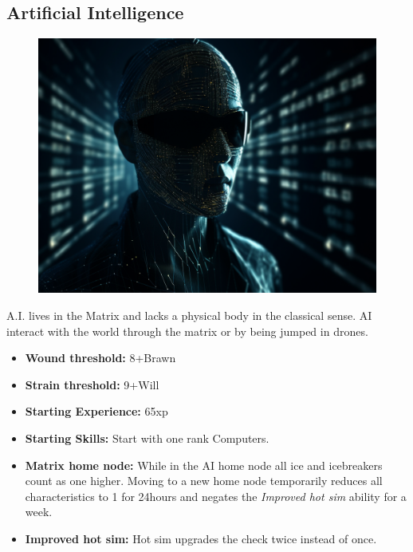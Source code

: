 \documentclass{book}
\begin{document}
\begin{multicols}{2}
	\subsection{Artificial Intelligence}
	\begin{figure}[H]
		\centering
		\includegraphics[width=0.7\linewidth]{images/ai}
		\caption[Artificial intelligence]{}
		\label{fig:ai}
	\end{figure}
	
	A.I. lives in the Matrix and lacks a physical body in the classical sense. AI interact with the world through the matrix or by being jumped in drones.
	
	\begin{itemize}
		\item \textbf{Wound threshold:} 8+Brawn
		\item \textbf{Strain threshold:} 9+Will
		\item \textbf{Starting Experience:} 65xp
		\item \textbf{Starting Skills:} Start with one rank Computers.
		\item \textbf{Matrix home node:} While in the AI home node all ice and icebreakers count as one higher. Moving to a new home node temporarily reduces all characteristics to 1 for 24hours and negates the \textit{Improved hot sim} ability for a week.
		\item \textbf{Improved hot sim: } Hot sim upgrades the check twice instead of once. 
	\end{itemize}
	
	

\end{multicols}
\end{document}

